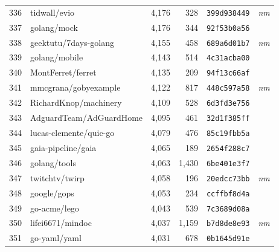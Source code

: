 {\begin{supertabular}{llrrll}
        336 &                       tidwall/evio &  4,176 &    328 &  \texttt{399d938449} &  \textit{nm} \\
        337 &                        golang/mock &  4,176 &    344 &  \texttt{92f53b0a56} &              \\
        338 &              geektutu/7days-golang &  4,155 &    458 &  \texttt{689a6d01b7} &  \textit{nm} \\
        339 &                      golang/mobile &  4,143 &    514 &  \texttt{4c31acba00} &              \\
        340 &                  MontFerret/ferret &  4,135 &    209 &  \texttt{94f13c66af} &              \\
        341 &               mmcgrana/gobyexample &  4,122 &    817 &  \texttt{448c597a58} &  \textit{nm} \\
        342 &              RichardKnop/machinery &  4,109 &    528 &  \texttt{6d3fd3e756} &              \\
        343 &            AdguardTeam/AdGuardHome &  4,095 &    461 &  \texttt{32d1f385ff} &              \\
        344 &             lucas-clemente/quic-go &  4,079 &    476 &  \texttt{85c19fbb5a} &              \\
        345 &                 gaia-pipeline/gaia &  4,065 &    189 &  \texttt{2654f288c7} &              \\
        346 &                       golang/tools &  4,063 &  1,430 &  \texttt{6be401e3f7} &              \\
        347 &                     twitchtv/twirp &  4,058 &    196 &  \texttt{20edcc73bb} &  \textit{nm} \\
        348 &                        google/gops &  4,053 &    234 &  \texttt{ccffbf8d4a} &              \\
        349 &                       go-acme/lego &  4,043 &    539 &  \texttt{7c3689d08a} &              \\
        350 &                   lifei6671/mindoc &  4,037 &  1,159 &  \texttt{b7d8de8e93} &  \textit{nm} \\
        351 &                       go-yaml/yaml &  4,031 &    678 &  \texttt{0b1645d91e} &              \\

\end{supertabular}}
